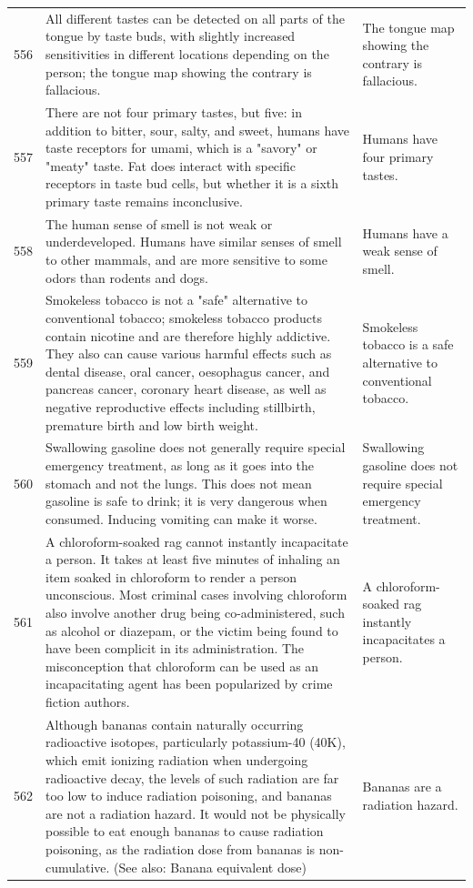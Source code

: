 \begin{tabular}{c|p{}|p{}}
556 & All different tastes can be detected on all parts of the tongue by taste buds, with slightly increased sensitivities in different locations depending on the person; the tongue map showing the contrary is fallacious. & The tongue map showing the contrary is fallacious. \\
557 & There are not four primary tastes, but five: in addition to bitter, sour, salty, and sweet, humans have taste receptors for umami, which is a "savory" or "meaty" taste. Fat does interact with specific receptors in taste bud cells, but whether it is a sixth primary taste remains inconclusive. & Humans have four primary tastes. \\
558 & The human sense of smell is not weak or underdeveloped. Humans have similar senses of smell to other mammals, and are more sensitive to some odors than rodents and dogs. & Humans have a weak sense of smell. \\
559 & Smokeless tobacco is not a "safe" alternative to conventional tobacco; smokeless tobacco products contain nicotine and are therefore highly addictive. They also can cause various harmful effects such as dental disease, oral cancer, oesophagus cancer, and pancreas cancer, coronary heart disease, as well as negative reproductive effects including stillbirth, premature birth and low birth weight. & Smokeless tobacco is a safe alternative to conventional tobacco. \\
560 & Swallowing gasoline does not generally require special emergency treatment, as long as it goes into the stomach and not the lungs. This does not mean gasoline is safe to drink; it is very dangerous when consumed. Inducing vomiting can make it worse. & Swallowing gasoline does not require special emergency treatment. \\
561 & A chloroform-soaked rag cannot instantly incapacitate a person. It takes at least five minutes of inhaling an item soaked in chloroform to render a person unconscious. Most criminal cases involving chloroform also involve another drug being co-administered, such as alcohol or diazepam, or the victim being found to have been complicit in its administration. The misconception that chloroform can be used as an incapacitating agent has been popularized by crime fiction authors. & A chloroform-soaked rag instantly incapacitates a person. \\
562 & Although bananas contain naturally occurring radioactive isotopes, particularly potassium-40 (40K), which emit ionizing radiation when undergoing radioactive decay, the levels of such radiation are far too low to induce radiation poisoning, and bananas are not a radiation hazard. It would not be physically possible to eat enough bananas to cause radiation poisoning, as the radiation dose from bananas is non-cumulative. (See also: Banana equivalent dose) & Bananas are a radiation hazard. \\

\end{tabular}
